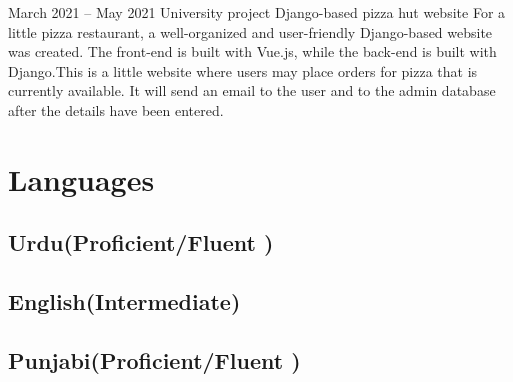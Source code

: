\documentclass[
	10pt, %
]{FreemanCV}
\begin{document}
\begin{paracol}{2}
\jobentry
	{ March 2021 -- May 2021} %
	{University project} %
	{} %
	{Django-based pizza hut website} %
	{For a little pizza restaurant, a well-organized and user-friendly Django-based website was created. The front-end is built with Vue.js, while the back-end is built with Django.This is a little website where users may place orders for pizza that is currently available. It will send an email to the user and to the admin database after the details have been entered. } %
\section{Languages}





\subsection{Urdu(Proficient/Fluent )}
\subsection{English(Intermediate)}
\subsection{Punjabi(Proficient/Fluent )}







\end{paracol} %

\end{document}
